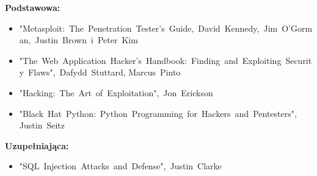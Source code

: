\documentclass[12pt, a4paper]{article}
\begin{document}
\textbf{Podstawowa:}
\begin{itemize}
  \item "Metasploit: The Penetration Tester's Guide, David Kennedy, Jim O'Gorman, Justin Brown i Peter Kim
  \item "The Web Application Hacker's Handbook: Finding and Exploiting Security Flaws", Dafydd Stuttard, Marcus Pinto
  \item "Hacking: The Art of Exploitation", Jon Erickson
  \item "Black Hat Python: Python Programming for Hackers and Pentesters", Justin Seitz
\end{itemize}

\textbf{Uzupełniająca:}
\begin{itemize}
  \item "SQL Injection Attacks and Defense", Justin Clarke
\end{itemize}
\end{document}
